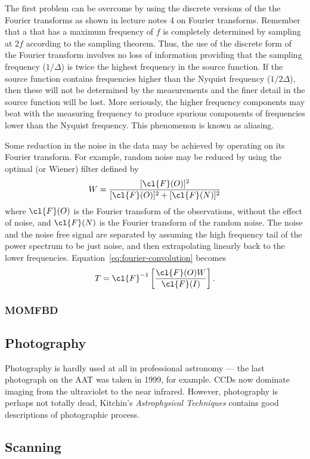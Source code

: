 The first problem can be overcome by using the discrete versions of the the Fourier transforms as shown in lecture notes 4 on Fourier transforms. Remember that a that has 
a maximum frequency of $f$ is completely determined by sampling at $2f$ according to the sampling theorem. Thus, the use of the discrete form of the Fourier transform involves no loss of information providing that the sampling frequency (${1/\Delta}$) is twice the highest frequency in the source function. If the source function contains frequencies higher than the Nyquist frequency (${1/2\Delta}$), then these will not be determined by the measurements and the finer detail in the source function will be lost. More seriously, the higher frequency components may beat with the measuring frequency to produce spurious components of frequencies lower than the Nyquist frequency. This phenomenon is known as aliasing. 

Some reduction in the noise in the data may be achieved by operating on its Fourier transform. For example, random noise may be reduced by using the optimal (or Wiener) filter defined by 
\[
W={[\cl{F}(O)]^2\over[\cl{F}(O)]^2+[\cl{F}(N)]^2}
\]
where $\cl{F}(O)$ is the Fourier transform of the observations, without the effect of noise, and $\cl{F}(N)$ is the Fourier transform of the random noise. The noise and the noise free signal are separated by assuming the high frequency tail of the power spectrum to be just noise, and then extrapolating linearly back to the lower frequencies. Equation~\ref{eq:fourier-convolution} becomes
\[
T=\cl{F}^{-1}\left[{\cl{F}(O)W\over\cl{F}(I)}\right].
\]
\subsubsection{MOMFBD}

\subsection{Photography}
Photography is hardly used at all in professional astronomy --- the last photograph on the AAT was taken in 1999, for example. CCDs now dominate imaging from the ultraviolet to the near infrared. However, photography is perhaps not totally dead, Kitchin's {\it Astrophysical Techniques} contains good descriptions of photographic process.

\subsection{Scanning}

